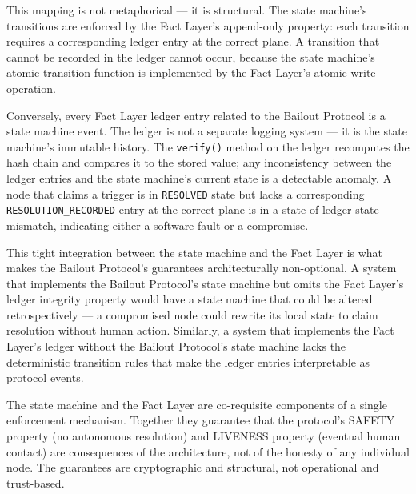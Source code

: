 This mapping is not metaphorical --- it is structural. The state machine's transitions are enforced by the Fact Layer's append-only property: each transition requires a corresponding ledger entry at the correct plane. A transition that cannot be recorded in the ledger cannot occur, because the state machine's atomic transition function is implemented by the Fact Layer's atomic write operation.

Conversely, every Fact Layer ledger entry related to the Bailout Protocol is a state machine event. The ledger is not a separate logging system --- it is the state machine's immutable history. The \texttt{verify()} method on the ledger recomputes the hash chain and compares it to the stored value; any inconsistency between the ledger entries and the state machine's current state is a detectable anomaly. A node that claims a trigger is in \texttt{RESOLVED} state but lacks a corresponding \texttt{RESOLUTION\_RECORDED} entry at the correct plane is in a state of ledger-state mismatch, indicating either a software fault or a compromise.

This tight integration between the state machine and the Fact Layer is what makes the Bailout Protocol's guarantees architecturally non-optional. A system that implements the Bailout Protocol's state machine but omits the Fact Layer's ledger integrity property would have a state machine that could be altered retrospectively --- a compromised node could rewrite its local state to claim resolution without human action. Similarly, a system that implements the Fact Layer's ledger without the Bailout Protocol's state machine lacks the deterministic transition rules that make the ledger entries interpretable as protocol events.

The state machine and the Fact Layer are co-requisite components of a single enforcement mechanism. Together they guarantee that the protocol's SAFETY property (no autonomous resolution) and LIVENESS property (eventual human contact) are consequences of the architecture, not of the honesty of any individual node. The guarantees are cryptographic and structural, not operational and trust-based.

